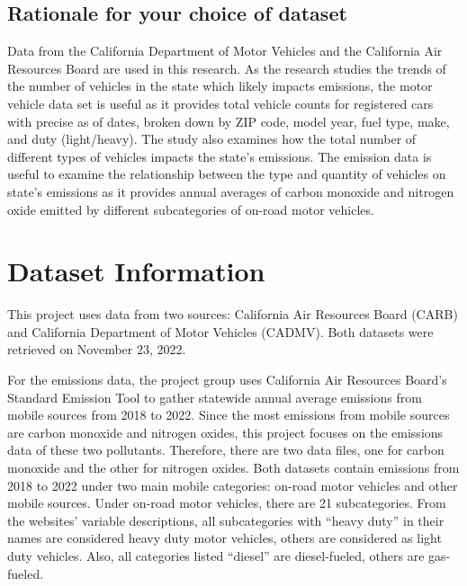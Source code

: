 \documentclass[
  12pt,
]{article}
\begin{document}
\hypertarget{rationale-for-your-choice-of-dataset}{%
\subsection{Rationale for your choice of
dataset}\label{rationale-for-your-choice-of-dataset}}

Data from the California Department of Motor Vehicles and the California
Air Resources Board are used in this research. As the research studies
the trends of the number of vehicles in the state which likely impacts
emissions, the motor vehicle data set is useful as it provides total
vehicle counts for registered cars with precise as of dates, broken down
by ZIP code, model year, fuel type, make, and duty (light/heavy). The
study also examines how the total number of different types of vehicles
impacts the state's emissions. The emission data is useful to examine
the relationship between the type and quantity of vehicles on state's
emissions as it provides annual averages of carbon monoxide and nitrogen
oxide emitted by different subcategories of on-road motor vehicles.

\newpage

\hypertarget{dataset-information}{%
\section{Dataset Information}\label{dataset-information}}

This project uses data from two sources: California Air Resources Board
(CARB) and California Department of Motor Vehicles (CADMV). Both
datasets were retrieved on November 23, 2022.

For the emissions data, the project group uses California Air Resources
Board's Standard Emission Tool to gather statewide annual average
emissions from mobile sources from 2018 to 2022. Since the most
emissions from mobile sources are carbon monoxide and nitrogen oxides,
this project focuses on the emissions data of these two pollutants.
Therefore, there are two data files, one for carbon monoxide and the
other for nitrogen oxides. Both datasets contain emissions from 2018 to
2022 under two main mobile categories: on-road motor vehicles and other
mobile sources. Under on-road motor vehicles, there are 21
subcategories. From the websites' variable descriptions, all
subcategories with ``heavy duty'' in their names are considered heavy
duty motor vehicles, others are considered as light duty vehicles. Also,
all categories listed ``diesel'' are diesel-fueled, others are
gas-fueled.
\end{document}
